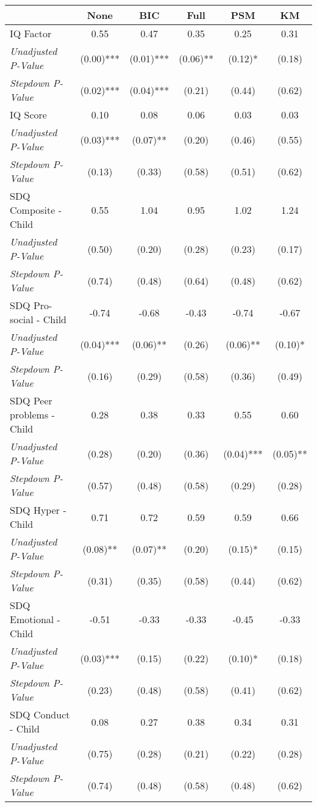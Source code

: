 \begin{tabular}{l c c c c c}
\toprule
 & None & BIC & Full & PSM & KM \\
\midrule
IQ Factor & 0.55 & 0.47 & 0.35 & 0.25 & 0.31 \\
\quad \textit{Unadjusted P-Value} & (0.00)*** & (0.01)*** & (0.06)** & (0.12)* & (0.18) \\
\quad \textit{Stepdown P-Value} & (0.02)*** & (0.04)*** & (0.21) & (0.44) & (0.62) \\
IQ Score & 0.10 & 0.08 & 0.06 & 0.03 & 0.03 \\
\quad \textit{Unadjusted P-Value} & (0.03)*** & (0.07)** & (0.20) & (0.46) & (0.55) \\
\quad \textit{Stepdown P-Value} & (0.13) & (0.33) & (0.58) & (0.51) & (0.62) \\
SDQ Composite - Child & 0.55 & 1.04 & 0.95 & 1.02 & 1.24 \\
\quad \textit{Unadjusted P-Value} & (0.50) & (0.20) & (0.28) & (0.23) & (0.17) \\
\quad \textit{Stepdown P-Value} & (0.74) & (0.48) & (0.64) & (0.48) & (0.62) \\
SDQ Pro-social - Child & -0.74 & -0.68 & -0.43 & -0.74 & -0.67 \\
\quad \textit{Unadjusted P-Value} & (0.04)*** & (0.06)** & (0.26) & (0.06)** & (0.10)* \\
\quad \textit{Stepdown P-Value} & (0.16) & (0.29) & (0.58) & (0.36) & (0.49) \\
SDQ Peer problems - Child & 0.28 & 0.38 & 0.33 & 0.55 & 0.60 \\
\quad \textit{Unadjusted P-Value} & (0.28) & (0.20) & (0.36) & (0.04)*** & (0.05)** \\
\quad \textit{Stepdown P-Value} & (0.57) & (0.48) & (0.58) & (0.29) & (0.28) \\
SDQ Hyper - Child & 0.71 & 0.72 & 0.59 & 0.59 & 0.66 \\
\quad \textit{Unadjusted P-Value} & (0.08)** & (0.07)** & (0.20) & (0.15)* & (0.15) \\
\quad \textit{Stepdown P-Value} & (0.31) & (0.35) & (0.58) & (0.44) & (0.62) \\
SDQ Emotional - Child & -0.51 & -0.33 & -0.33 & -0.45 & -0.33 \\
\quad \textit{Unadjusted P-Value} & (0.03)*** & (0.15) & (0.22) & (0.10)* & (0.18) \\
\quad \textit{Stepdown P-Value} & (0.23) & (0.48) & (0.58) & (0.41) & (0.62) \\
SDQ Conduct - Child & 0.08 & 0.27 & 0.38 & 0.34 & 0.31 \\
\quad \textit{Unadjusted P-Value} & (0.75) & (0.28) & (0.21) & (0.22) & (0.28) \\
\quad \textit{Stepdown P-Value} & (0.74) & (0.48) & (0.58) & (0.48) & (0.62) \\
\bottomrule
\end{tabular}
